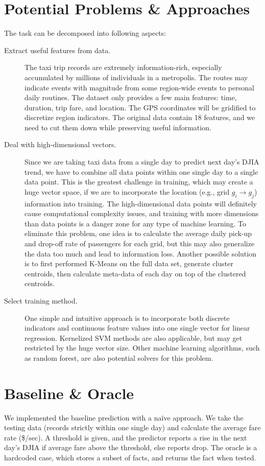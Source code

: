 \documentclass[a4paper]{article}
\begin{document}
\section{Potential Problems \& Approaches}
The task can be decomposed into following aspects:
\begin{description}
\item[Extract useful features from data.] The taxi trip records are extremely information-rich, especially accumulated by millions of individuals in a metropolis. The routes may indicate events with magnitude from some region-wide events to personal daily routines. The dataset only provides a few main features: time, duration, trip fare, and location. The GPS coordinates will be gridified to discretize region indicators. The original data contain 18 features, and we need to cut them down while preserving useful information.
\item[Deal with high-dimensional vectors.] Since we are taking taxi data from a single day to predict next day's DJIA trend, we have to combine all data points within one single day to a single data point. This is the greatest challenge in training, which may create a huge vector space, if we are to incorporate the location (e.g., grid $g_i\to g_j$) information into training. The high-dimensional data points will definitely cause computational complexity issues, and training with more dimensions than data points is a danger zone for any type of machine learning. To eliminate this problem, one idea is to calculate the average daily pick-up and drop-off rate of passengers for each grid, but this may also generalize the data too much and lead to information loss. Another possible solution is to first performed K-Means on the full data set, generate cluster centroids, then calculate meta-data of each day on top of the clustered centroids.
\item[Select training method.] One simple and intuitive approach is to incorporate both discrete indicators and continuous feature values into one single vector for linear regression. Kernelized SVM methods are also applicable, but may get restricted by the huge vector size. Other machine learning algorithms, such as random forest, are also potential solvers for this problem.
\end{description}
\section{Baseline \& Oracle}
We implemented the baseline prediction with a naïve approach. We take the testing data (records strictly within one single day) and calculate the average fare rate (\$/sec). A threshold is given, and the predictor reports a rise in the next day's DJIA if average fare above the threshold, else reports drop. The oracle is a hardcoded case, which stores a subset of facts, and returns the fact when tested.
\end{document}
